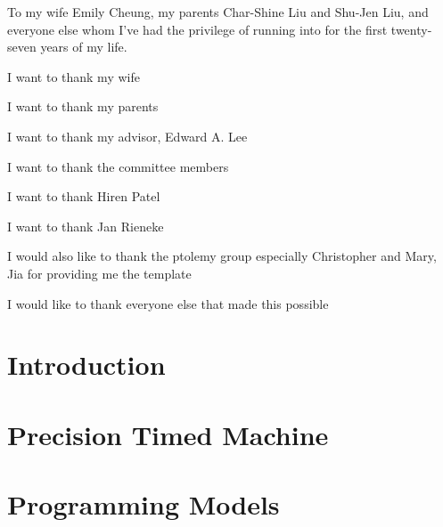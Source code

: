 \documentclass[11pt]{ucthesis}
\begin{document}
\begin{frontmatter}

\begin{dedication}
\null\vfil
{\large
\begin{center}
To my wife Emily Cheung, my parents Char-Shine Liu and Shu-Jen Liu, and everyone else whom
I've had the privilege of running into for the first twenty-seven years of my
life.
\end{center}}
\vfil\null
\end{dedication}

\tableofcontents
\listoffigures
\listoftables
\begin{acknowledgements}

I want to thank my wife

I want to thank my parents

I want to thank my advisor, Edward A. Lee

I want to thank the committee members

I want to thank Hiren Patel

I want to thank Jan Rieneke

I would also like to thank the ptolemy group especially Christopher and Mary, Jia for providing me the template

I would like to thank everyone else that made this possible

\end{acknowledgements}

\end{frontmatter}

\chapter{Introduction}
\label{chapter:intro}


\chapter{Precision Timed Machine}
\label{chapter:pret}


\chapter{Programming Models}
\label{chapter:programming_models}

\end{document}
